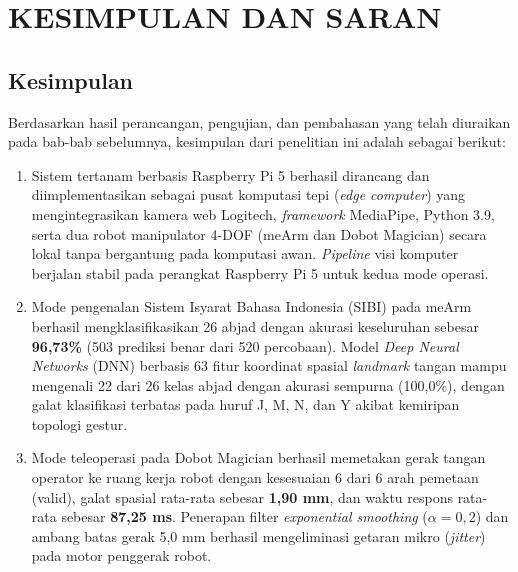 \chapter{KESIMPULAN DAN SARAN}

\section{Kesimpulan}
Berdasarkan hasil perancangan, pengujian, dan pembahasan yang telah diuraikan pada bab-bab sebelumnya, kesimpulan dari penelitian ini adalah sebagai berikut:
\begin{enumerate}[label=\arabic*.]
    \item Sistem tertanam berbasis Raspberry Pi 5 berhasil dirancang dan diimplementasikan sebagai pusat komputasi tepi (\textit{edge computer}) yang mengintegrasikan kamera web Logitech, \textit{framework} MediaPipe, Python 3.9, serta dua robot manipulator 4-DOF (meArm dan Dobot Magician) secara lokal tanpa bergantung pada komputasi awan. \textit{Pipeline} visi komputer berjalan stabil pada perangkat Raspberry Pi 5 untuk kedua mode operasi.
    \item Mode pengenalan Sistem Isyarat Bahasa Indonesia (SIBI) pada meArm berhasil mengklasifikasikan 26 abjad dengan akurasi keseluruhan sebesar \textbf{96,73\%} (503 prediksi benar dari 520 percobaan). Model \textit{Deep Neural Networks} (DNN) berbasis 63 fitur koordinat spasial \textit{landmark} tangan mampu mengenali 22 dari 26 kelas abjad dengan akurasi sempurna (100,0\%), dengan galat klasifikasi terbatas pada huruf J, M, N, dan Y akibat kemiripan topologi gestur.
    \item Mode teleoperasi pada Dobot Magician berhasil memetakan gerak tangan operator ke ruang kerja robot dengan kesesuaian 6 dari 6 arah pemetaan (valid), galat spasial rata-rata sebesar \textbf{1,90 mm}, dan waktu respons rata-rata sebesar \textbf{87,25 ms}. Penerapan filter \textit{exponential smoothing} ($\alpha = 0{,}2$) dan ambang batas gerak 5,0 mm berhasil mengeliminasi getaran mikro (\textit{jitter}) pada motor penggerak robot.
\end{enumerate}

